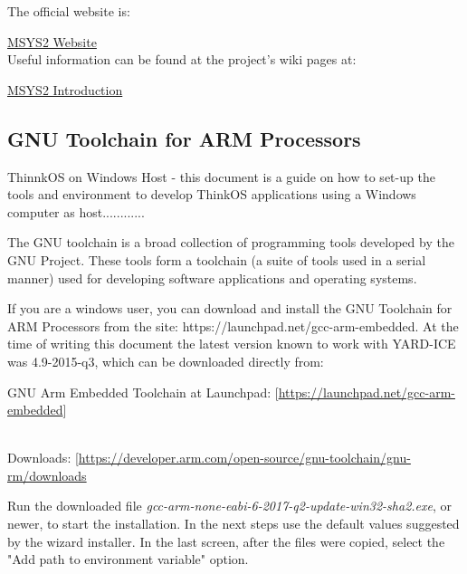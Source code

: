 The official website is:

\href{http://www.msys2.org/}{MSYS2 Website}\\

Useful information can be found at the project's wiki pages at: 

\href{https://github.com/msys2/msys2/wiki/MSYS2-introduction}{MSYS2 Introduction}\\

\subsection{GNU Toolchain for ARM Processors}

ThinnkOS on Windows Host - this document is a guide on how to set-up the tools and environment to develop ThinkOS applications using a Windows computer as host............

The GNU toolchain is a broad collection of programming tools developed by the GNU Project. These tools form a toolchain (a suite of tools used in a serial manner) used for developing software applications and operating systems.

If you are a windows user, you can download and install the GNU Toolchain for ARM Processors from the site: https://launchpad.net/gcc-arm-embedded. At the time of writing this document the latest version known to work with YARD-ICE was 4.9-2015-q3, which can be downloaded directly from:

\begin{flushleft}
GNU Arm Embedded Toolchain at Launchpad:
[\href{https://launchpad.net/gcc-arm-embedded}{https://launchpad.net/gcc-arm-embedded}]\\
\end{flushleft}

\begin{flushleft}
\\

Downloads: [\href{https://developer.arm.com/open-source/gnu-toolchain/gnu-rm/downloads}{https://developer.arm.com/open-source/gnu-toolchain/gnu-rm/downloads}\\
\end{flushleft}

Run the downloaded file \textit{gcc-arm-none-eabi-6-2017-q2-update-win32-sha2.exe}, or newer, to start the installation.
In the next steps use the default values suggested by the wizard installer.
In the last screen, after the files were copied, select the "Add path to environment variable" option.

